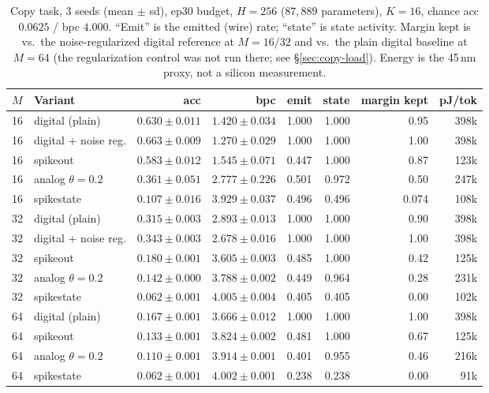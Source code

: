 \begin{table}[t]
\centering
\caption{Copy task, 3 seeds (mean $\pm$ sd), ep30 budget, $H{=}256$ ($87{,}889$ parameters),
$K{=}16$, chance acc $0.0625$ / bpc $4.000$. ``Emit'' is the emitted (wire) rate; ``state''
is state activity. Margin kept is vs.\ the noise-regularized digital reference at
$M{=}16/32$ and vs.\ the plain digital baseline at $M{=}64$ (the regularization control was
not run there; see \S\ref{sec:copy-load}). Energy is the 45\,nm proxy, not a silicon
measurement.}
\label{tab:copy}
\footnotesize
\begin{tabular}{l l r r r r r r}
\toprule
$M$ & Variant & acc & bpc & emit & state & margin kept & pJ/tok \\
\midrule
16 & digital (plain)      & $0.630 \pm 0.011$ & $1.420 \pm 0.034$ & 1.000 & 1.000 & 0.95 & 398k \\
16 & digital + noise reg. & $0.663 \pm 0.009$ & $1.270 \pm 0.029$ & 1.000 & 1.000 & 1.00 & 398k \\
16 & spikeout             & $0.583 \pm 0.012$ & $1.545 \pm 0.071$ & 0.447 & 1.000 & 0.87 & 123k \\
16 & analog $\theta{=}0.2$ & $0.361 \pm 0.051$ & $2.777 \pm 0.226$ & 0.501 & 0.972 & 0.50 & 247k \\
16 & spikestate           & $0.107 \pm 0.016$ & $3.929 \pm 0.037$ & 0.496 & 0.496 & 0.074 & 108k \\
\midrule
32 & digital (plain)      & $0.315 \pm 0.003$ & $2.893 \pm 0.013$ & 1.000 & 1.000 & 0.90 & 398k \\
32 & digital + noise reg. & $0.343 \pm 0.003$ & $2.678 \pm 0.016$ & 1.000 & 1.000 & 1.00 & 398k \\
32 & spikeout             & $0.180 \pm 0.001$ & $3.605 \pm 0.003$ & 0.485 & 1.000 & 0.42 & 125k \\
32 & analog $\theta{=}0.2$ & $0.142 \pm 0.000$ & $3.788 \pm 0.002$ & 0.449 & 0.964 & 0.28 & 231k \\
32 & spikestate           & $0.062 \pm 0.001$ & $4.005 \pm 0.004$ & 0.405 & 0.405 & 0.00 & 102k \\
\midrule
64 & digital (plain)      & $0.167 \pm 0.001$ & $3.666 \pm 0.012$ & 1.000 & 1.000 & 1.00 & 398k \\
64 & spikeout             & $0.133 \pm 0.001$ & $3.824 \pm 0.002$ & 0.481 & 1.000 & 0.67 & 125k \\
64 & analog $\theta{=}0.2$ & $0.110 \pm 0.001$ & $3.914 \pm 0.001$ & 0.401 & 0.955 & 0.46 & 216k \\
64 & spikestate           & $0.062 \pm 0.001$ & $4.002 \pm 0.001$ & 0.238 & 0.238 & 0.00 & 91k \\
\bottomrule
\end{tabular}
\end{table}

